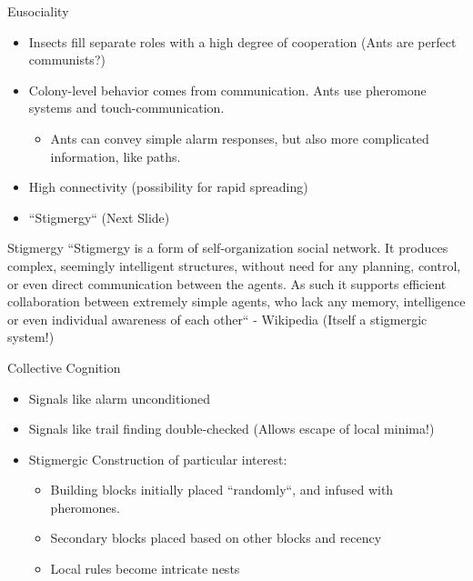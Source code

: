 \documentclass{beamer}
\begin{document}
  \begin{frame}{Eusociality}
      \begin{itemize}
          \item Insects fill separate roles with a high degree of cooperation \tiny (Ants are perfect communists?) \normalsize
          \item Colony-level behavior comes from communication. Ants use pheromone systems and touch-communication.
              \begin{itemize}
                  \item Ants can convey simple alarm responses, but also more complicated information, like paths.
              \end{itemize}
          \item High connectivity (possibility for rapid spreading)
          \item ``Stigmergy`` (Next Slide)
      \end{itemize}
  \end{frame}

  \begin{frame}{Stigmergy}
      ``Stigmergy is a form of self-organization social network. It produces complex, seemingly intelligent structures, without need for any planning, control, or even direct communication between the agents. As such it supports efficient collaboration between extremely simple agents, who lack any memory, intelligence or even individual awareness of each other`` - Wikipedia (Itself a stigmergic system!)
  \end{frame} 

  \begin{frame}{Collective Cognition}
      \begin{itemize}
          \item Signals like alarm unconditioned
          \item Signals like trail finding double-checked \tiny (Allows escape of local minima!) \normalsize
          \item Stigmergic Construction of particular interest:
              \begin{itemize}
                  \item Building blocks initially placed ``randomly``, and infused with pheromones.
                  \item Secondary blocks placed based on other blocks and recency
                  \item Local rules become intricate nests
              \end{itemize}
      \end{itemize}
  \end{frame}
\end{document}
